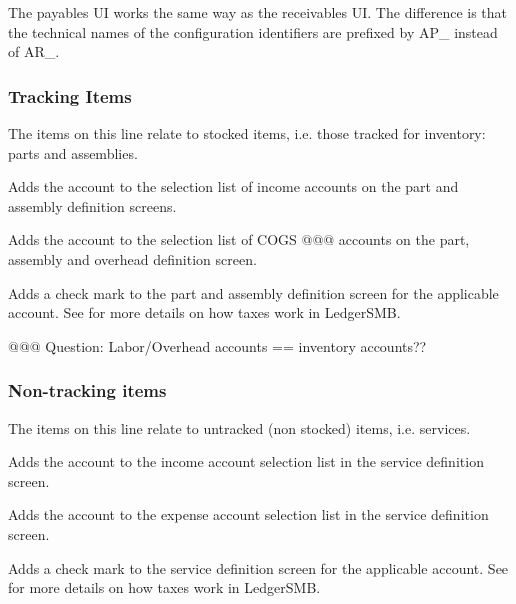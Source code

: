 The payables UI works the same way as the receivables UI. The difference is
that the technical names of the configuration identifiers are prefixed by AP\_ instead
of AR\_.

\subsubsection{Tracking Items}
\label{subsubsec-coa-tracking-items}

The items on this line relate to stocked items, i.e. those tracked for inventory: parts and
assemblies.

\begin{description}[style=nextline]
\item[Income (IC\_sale)] Adds the account to the selection list of income accounts on the
   part and assembly definition screens.
\item[COGS (IC\_cogs)] Adds the account to the selection list of COGS @@@ accounts on the
   part, assembly and overhead definition screen.
\item[Tax (IC\_taxpart)] Adds a check mark to the part and assembly definition screen
   for the applicable account. See  for more details on how taxes
   work in LedgerSMB.
\end{description}

@@@ Question: Labor/Overhead accounts == inventory accounts??

\subsubsection{Non-tracking items}
\label{subsubsec-coa-non-tracking-items}

The items on this line relate to untracked (non stocked) items, i.e. services.

\begin{description}[style=nextline]
\item[Income (IC\_income)] Adds the account to the income account selection list in
   the service definition screen.
\item[Expense (IC\_expense)] Adds the account to the expense account selection list in
   the service definition screen.
\item[Tax (IC\_taxservice)] Adds a check mark to the service definition screen for the
   applicable account. See  for more details on how taxes work in LedgerSMB.
\end{description}

